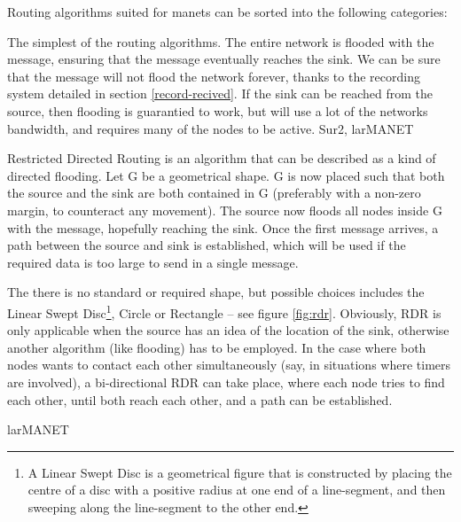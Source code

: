 Routing algorithms suited for \acp{manet} can be sorted into the following categories:
\begin{description}
{The simplest of the routing algorithms. The entire network is flooded with the message, ensuring that the message eventually reaches the sink. We can be sure that the message will not flood the network forever, thanks to the recording system detailed in section \ref{record-recived}. If the sink can be reached from the source, then flooding is  guarantied to work, but will use a lot of the networks bandwidth, and requires many of the nodes to be active.}
{Sur2, larMANET} 


      {Restricted Directed Routing is an algorithm that can be described as a kind of directed flooding. Let G be a geometrical shape. G is now placed such that both the source and the sink are both contained in G (preferably with a non-zero margin, to counteract any movement). The source now floods all nodes inside G with the message, hopefully reaching the sink. Once the first message arrives, a path between the source and sink is established, which will be used if the required data is too large to send in a single message.

The there is no standard or required shape, but possible choices includes the Linear Swept Disc\footnote{A Linear Swept Disc is a geometrical figure that is constructed by placing the centre of a disc with a positive radius at one end of a line-segment, and then sweeping along the line-segment to the other end.}, Circle or Rectangle -- see figure \ref{fig:rdr}. Obviously, RDR is only applicable when the source has an idea of the location of the sink, otherwise another algorithm (like flooding) has to be employed. In the case where both nodes wants to contact each other simultaneously (say, in situations where timers are involved), a bi-directional RDR can take place, where each node tries to find each other, until both reach each other, and a path can be established.}
{larMANET}


\end{description}
